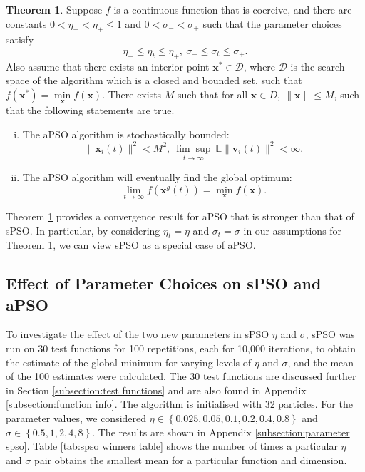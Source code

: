 \documentclass[12pt]{article}
\newcommand{\mb}[1]{\mathbf{#1}}
\theoremstyle{definition}
\newtheorem{theorem}{Theorem}[section]
\begin{document}
\begin{theorem}
\label{theorem:apso convergence}
Suppose $f$ is a continuous function that is coercive, and there are constants $0 < \eta_- < \eta_+ \leq 1$ and $0 < \sigma_- < \sigma_+$ such that the parameter choices satisfy
$$\eta_- \leq \eta_t \leq \eta_+, \ \sigma_- \leq \sigma_t \leq \sigma_+.$$
Also assume that there exists an interior point $\mb{x}^* \in \mathcal{D}$, where $\mathcal{D}$ is the search space of the algorithm which is a closed and bounded set, such that $f(\mb{x}^*) = \underset{\mb{x}}{\min} f(\mb{x})$. There exists $M$ such that for all $\mb{x} \in D, \ \lVert \mb{x} \rVert \leq M$, such that the following statements are true.
\begin{enumerate}[(i)]
    \item The aPSO algorithm is stochastically bounded:
    $$\lVert \mb{x}_i(t) \rVert^2 < M^2, \
    \underset{t \rightarrow \infty}{\lim \sup} \ \mathbb{E} \lVert \mb{v}_i(t) \rVert^2 < \infty.$$
    \item The aPSO algorithm will eventually find the global optimum:
    $$\underset{t \rightarrow \infty}{\lim} f(\mb{x}^g(t)) = \underset{\mb{x}}{\min} f(\mb{x}).$$
\end{enumerate}
\end{theorem}

Theorem \ref{theorem:apso convergence} provides a convergence result for aPSO that is stronger than that of sPSO. In particular, by considering $\eta_t = \eta$ and $\sigma_t = \sigma$ in our assumptions for Theorem \ref{theorem:apso convergence}, we can view sPSO as a special case of aPSO.

\subsection{Effect of Parameter Choices on sPSO and aPSO}
\label{subsection:parameter choices}
To investigate the effect of the two new parameters in sPSO $\eta$ and $\sigma$, sPSO was run on 30 test functions for 100 repetitions, each for 10,000 iterations, to obtain the estimate of the global minimum for varying levels of $\eta$ and $\sigma$, and the mean of the 100 estimates were calculated. The 30 test functions are discussed further in Section \ref{subsection:test functions} and are also found in Appendix \ref{subsection:function info}. The algorithm is initialised with 32 particles. For the parameter values, we considered $\eta \in \left\{ 0.025, 0.05, 0.1, 0.2, 0.4, 0.8 \right\}$ and $\sigma \in \left\{ 0.5, 1, 2, 4, 8 \right\}$. The results are shown in Appendix \ref{subsection:parameter spso}. Table \ref{tab:spso winners table} shows the number of times a particular $\eta$ and $\sigma$ pair obtains the smallest mean for a particular function and dimension. \newline
\end{document}
